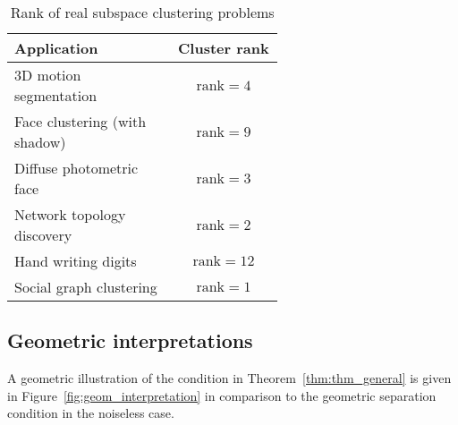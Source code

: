 \documentclass[12pt,heading]{ctexbook}
\begin{document}
\begin{table}
  \centering
 \begin{tabular}{|p{0.6\linewidth}|c|}
   \hline
   \textbf{Application} & \textbf{Cluster rank}\\
   \hline
   3D motion segmentation \cite{costeira1998motion_seg} & $\mathrm{rank}=4$ \\\hline
   Face clustering (with shadow) \cite{basri2003lambertianface} & $\mathrm{rank}=9$ \\\hline
   Diffuse photometric face \cite{zhou2007PhotometricFace}& $\mathrm{rank}=3$ \\\hline
   Network topology discovery \cite{eriksson2011high_rankMC} & $\mathrm{rank}=2$ \\\hline
   Hand writing digits \cite{hastie1998MNIST}&  $\mathrm{rank}=12$\\\hline
   Social graph clustering \cite{xu2011graphclustering}& $\mathrm{rank}=1$ \\
   \hline
 \end{tabular}
  \caption{Rank of real subspace clustering problems}\label{tab:low_rank}
\end{table}




\subsection{Geometric interpretations}%
A geometric illustration of the condition in Theorem~\ref{thm:thm_general} is given in Figure~\ref{fig:geom_interpretation} in comparison to the geometric separation condition in the noiseless case.
\end{document}
